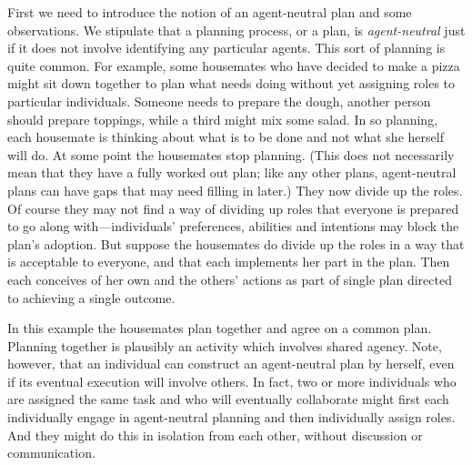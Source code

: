 \documentclass[12pt,\papersize]{extarticle}
\begin{document}

First we need to introduce the notion of an agent-neutral plan and some  observations.
We stipulate that a planning process, or a plan, is \emph{agent-neutral} just if it does not involve identifying any particular agents.  
This sort of planning is quite common.
For example, some housemates who have decided to make a pizza might sit down together to plan what needs doing without yet assigning roles to particular individuals. 
Someone needs to prepare the dough, 
another person should prepare toppings,
while a third might mix some salad.
In so planning, each housemate is thinking about what is to be done and not what she herself will do.  
At some point the housemates stop planning.
(This does not necessarily mean that they have a fully worked out plan; like any other plans, agent-neutral plans can have gaps that may need filling in later.)
They now divide up the roles.
Of course they may not find a way of dividing up roles that everyone is prepared to go along with---individuals' preferences, abilities and intentions may block the plan's adoption.
But suppose the housemates do divide up the roles in a way that is acceptable to everyone, 
	and that each implements her part in the plan.
Then each conceives of her own and the others' actions as part of single plan directed to achieving a single outcome.

In this example
	the housemates plan together and agree on a common plan.
	Planning together is plausibly an activity which involves shared agency.
	Note, however, that an individual can construct an agent-neutral plan by herself, even if its eventual execution will involve others. 
	In fact, two or more individuals who are assigned the same task and who will eventually collaborate might first each individually engage in agent-neutral planning and then individually assign roles.
	And they might do this in isolation from each other, without discussion or communication.
\end{document}
